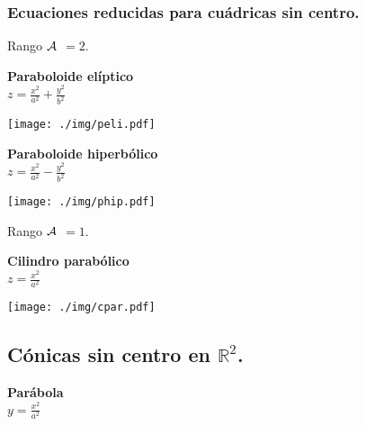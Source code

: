 \subsubsection{Ecuaciones reducidas para cuádricas sin centro.}

Rango $\cal A$ $=2$.

\begin{minipage}[c]{0.45\textwidth}
  {\bf Paraboloide elíptico}\vspace{1em}\\
  $\displaystyle z = \frac{x^2}{a^2} + \frac{y^2}{b^2}$
\end{minipage}\hfill
\begin{minipage}[]{0.45\textwidth}
\texttt{[image: ./img/peli.pdf]}
\end{minipage}

\begin{minipage}[c]{0.5\textwidth}
  {\bf Paraboloide hiperbólico}\vspace{1em}\\
  $\displaystyle z = \frac{x^2}{a^2} - \frac{y^2}{b^2}$
\end{minipage}\hfill
\begin{minipage}[]{0.5\textwidth}
    \texttt{[image: ./img/phip.pdf]}
\end{minipage}

Rango $\cal A$ $=1$.

\begin{minipage}[c]{0.45\textwidth}
  {\bf Cilindro parabólico}\vspace{1em}\\
  $\displaystyle z = \frac{x^2}{a^2}$
\end{minipage}\hfill
\begin{minipage}[]{0.45\textwidth}
\texttt{[image: ./img/cpar.pdf]}
\end{minipage}


\subsection{Cónicas sin centro en $\mathbb{R}^2$.}


\begin{minipage}[c]{0.45\textwidth}
  {\bf Parábola}\vspace{1em}\\
  $\displaystyle y = \frac{x^2}{a^2}$
\end{minipage}\hfill
\begin{minipage}[]{0.35\textwidth}
\end{minipage}




